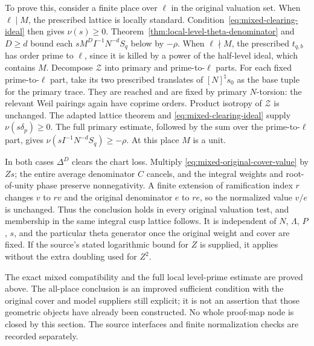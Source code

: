 To prove this, consider a finite place over $\ell$ in the original
valuation set.  When $\ell\mid M$, the prescribed lattice is locally
standard.  Condition~\eqref{eq:mixed-clearing-ideal} then gives
$\nu(s)\geq0$.  Theorem~\ref{thm:local-level-theta-denominator}
and $D\geq d$ bound each $sM^D I^{-1}N^{-d}S_q$ below by $-\rho$.
When $\ell\nmid M$, the prescribed $t_{q,b}$ has order prime to
$\ell$, since it is killed by a power of the half-level ideal, which
contains $M$.  Decompose $\mathcal Z$ into primary and prime-to-$\ell$
parts.  For each fixed prime-to-$\ell$ part, take its two prescribed
translates of $[N]^\natural s_0$ as the base tuple for the primary
trace.  They are reached and are fixed by primary $N$-torsion:
the relevant Weil pairings again have coprime orders.  Product
isotropy of $\mathcal Z$ is unchanged.  The adapted lattice theorem
and \eqref{eq:mixed-clearing-ideal} supply
$\nu(s\delta_p)\geq0$.  The full primary estimate, followed by the
sum over the prime-to-$\ell$ part, gives
$\nu(sI^{-1}N^{-d}S_q)\geq-\rho$.
At this place $M$ is a unit.

In both cases $\Delta^D$ clears the chart loss.  Multiply
\eqref{eq:mixed-original-cover-value} by $Zs$; the entire average
denominator $C$ cancels, and the integral weights and root-of-unity
phase preserve nonnegativity.  A finite extension of ramification
index $r$ changes $v$ to $rv$ and the original denominator $e$ to
$re$, so the normalized value $v/e$ is unchanged.  Thus the conclusion
holds in every original valuation test, and membership in the same
integral cusp lattice follows.  It is independent of $N$, $\Lambda$,
$P$, $s$, and the particular theta generator once the original weight
and cover are fixed.  If the source's stated logarithmic bound for
$Z$ is supplied, it applies without the extra doubling used for
$Z^2$.

The exact mixed compatibility and the full local level-prime estimate
are proved above.  The all-place conclusion is an improved sufficient
condition with the original cover and model suppliers still explicit;
it is not an assertion that those geometric objects have already been
constructed.  No whole proof-map node is closed by this section.
The source interfaces and finite normalization checks are recorded
separately\cite{mixed-level-source}.

